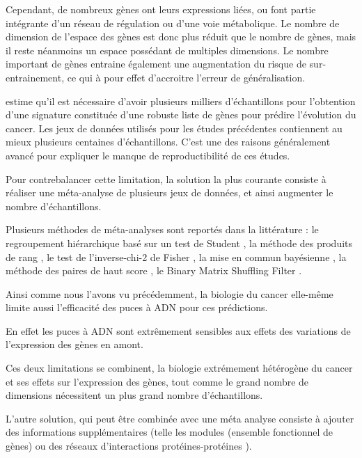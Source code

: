       Cependant, de nombreux gènes ont leurs expressions liées, ou font partie intégrante d'un réseau de régulation ou d'une voie métabolique.
      Le nombre de dimension de l'espace des gènes est donc plus réduit que le nombre de gènes, mais il reste néanmoins un espace possédant de multiples dimensions.
      Le nombre important de gènes entraine également une augmentation du risque de sur-entrainement, ce qui à pour effet d'accroitre l'erreur de généralisation.

      \citeauthor{EinDor2006} estime qu'il est nécessaire d'avoir plusieurs milliers d'échantillons pour l'obtention d'une signature constituée d'une robuste liste de gènes pour prédire l'évolution du cancer.
      Les jeux de données utilisés pour les études précédentes \citep{vandevijver2002,Wang2005} contiennent au mieux plusieurs centaines d'échantillons.
      C'est une des raisons généralement avancé pour expliquer le manque de reproductibilité de ces études.

      Pour contrebalancer cette limitation, la solution la plus courante consiste à réaliser une méta-analyse de plusieurs jeux de données, et ainsi augmenter le nombre d'échantillons.

      Plusieurs méthodes de méta-analyses sont reportés dans la littérature : le regroupement hiérarchique basé sur un test de Student \citep{Gentleman2004}, la méthode des produits de rang \citep{Hong2006}, le test de l'inverse-chi-2 de Fisher \citep{Fisher1925}, la mise en commun bayésienne \citep{Conlon2006}, la méthode des paires de haut score \citep{Xu2005}, le Binary Matrix Shuffling Filter \citep{Zhang2012e}.

      Ainsi comme nous l'avons vu précédemment, la biologie du cancer elle-même limite aussi l'efficacité des puces à \acs{ADN} pour ces prédictions.

      En effet les puces à \acs{ADN} sont extrêmement sensibles aux effets des variations de l'expression des gènes en amont.

      Ces deux limitations se combinent, la biologie extrémement hétérogène du cancer et ses effets sur l'expression des gènes, tout comme le grand nombre de dimensions nécessitent un plus grand nombre d'échantillons.

      L'autre solution, qui peut être combinée avec une méta analyse consiste à ajouter des informations supplémentaires (telle les modules (ensemble fonctionnel de gènes) \citep{VanVliet2007} ou des réseaux d'interactions protéines-protéines \citep{Chuang2007}).

